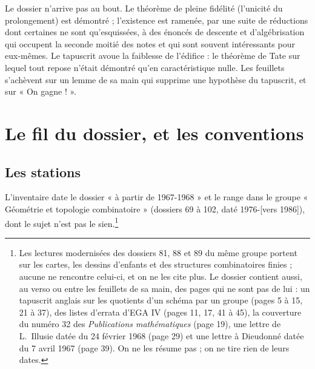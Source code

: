 \documentclass[11pt,a4paper]{article}
\begin{document}
\begin{resume}
Le dossier n'arrive pas au bout. Le théorème de pleine fidélité (l'unicité du
prolongement) est démontré ; l'existence est ramenée, par une suite de
réductions dont certaines ne sont qu'esquissées, à des énoncés de descente et
d'algébrisation qui occupent la seconde moitié des notes et qui sont souvent
intéressants pour eux-mêmes. Le tapuscrit avoue la faiblesse de l'édifice :
le théorème de Tate sur lequel tout repose n'était démontré qu'en
caractéristique nulle. Les feuillets s'achèvent sur un lemme de sa main qui
supprime une hypothèse du tapuscrit, et sur « On gagne ! ».

\end{resume}

\section*{Le fil du dossier, et les conventions}

\subsection*{Les stations}

L'inventaire date le dossier « à partir de 1967-1968 » et le range dans le
groupe « Géométrie et topologie combinatoire » (dossiers 69 à 102, daté
1976-[vers 1986]), dont le sujet n'est pas le sien.\footnote{Les lectures
modernisées des dossiers 81, 88 et 89 du même groupe portent sur les cartes,
les dessins d'enfants et des structures combinatoires finies ; aucune ne
rencontre celui-ci, et on ne les cite plus. Le dossier contient aussi, au
verso ou entre les feuillets de sa main, des pages qui ne sont pas de lui : un
tapuscrit anglais sur les quotients d'un schéma par un groupe (pages 5 à 15,
21 à 37), des listes d'errata d'EGA IV (pages 11, 17, 41 à 45), la couverture
du numéro 32 des \emph{Publications mathématiques} (page 19), une lettre de
L.~Illusie datée du 24 février 1968 (page 29) et une lettre à Dieudonné datée
du 7 avril 1967 (page 39). On ne les résume pas ; on ne tire rien de leurs
dates.}
\end{document}
